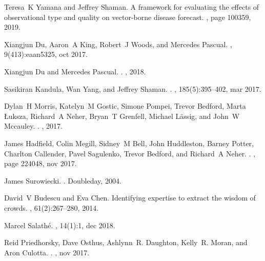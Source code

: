 \documentclass[a4paper]{article}
\begin{document}
\begin{thebibliography}{100}
Teresa~K Yamana and Jeffrey Shaman.
\newblock A framework for evaluating the effects of observational type and
  quality on vector-borne disease forecast.
, page 100359, 2019.

Xiangjun Du, Aaron~A King, Robert~J Woods, and Mercedes Pascual.
, 9(413):eaan5325, oct 2017.

Xiangjun Du and Mercedes Pascual.
.
, 2018.

Sasikiran Kandula, Wan Yang, and Jeffrey Shaman.
.
, 185(5):395--402, mar 2017.

Dylan~H Morris, Katelyn~M Gostic, Simone Pompei, Trevor Bedford, Marta
  {\L}uksza, Richard~A Neher, Bryan~T Grenfell, Michael L{\"{a}}ssig, and
  John~W Mccauley.
.
, 2017.

James Hadfield, Colin Megill, Sidney~M Bell, John Huddleston, Barney Potter,
  Charlton Callender, Pavel Sagulenko, Trevor Bedford, and Richard~A Neher.
.
, page 224048, nov 2017.

James Surowiecki.
.
\newblock Doubleday, 2004.

David~V Budescu and Eva Chen.
\newblock Identifying expertise to extract the wisdom of crowds.
, 61(2):267--280, 2014.

Marcel Salath{\'{e}}.
, 14(1):1, dec 2018.

Reid Priedhorsky, Dave Osthus, Ashlynn~R. Daughton, Kelly~R. Moran, and Aron
  Culotta.
.
, nov 2017.


\end{thebibliography}
\end{document}

